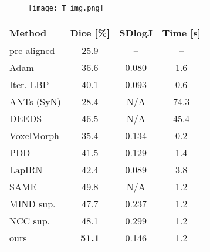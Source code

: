 \begin{figure}
  \centering
  \texttt{[image: T\_img.png]}
\end{figure}

\begin{table}
  \vspace{0.5em}\centering\wuhao
  \begin{tabular}{lccc}
    \toprule
    \textbf{Method} & \textbf{Dice [\%]} & \textbf{SDlogJ} & \textbf{Time [s]} \\
    \midrule
    pre-aligned     & 25.9               & --              & --                \\
    Adam            & 36.6               & 0.080           & 1.6               \\
    Iter. LBP       & 40.1               & 0.093           & 0.6               \\
    ANTs (SyN)      & 28.4               & {N/A}           & 74.3              \\
    DEEDS           & 46.5               & {N/A}           & 45.4              \\
    \midrule
    VoxelMorph      & 35.4               & 0.134           & 0.2               \\
    PDD             & 41.5               & 0.129           & 1.4               \\
    LapIRN          & 42.4               & 0.089           & 3.8               \\
    SAME            & 49.8               & {N/A}           & 1.2               \\
    \midrule
    MIND sup.       & 47.7               & 0.237           & 1.2               \\
    NCC sup.        & 48.1               & 0.299           & 1.2               \\
    \midrule
    ours            & \textbf{51.1}      & 0.146           & 1.2               \\
    \bottomrule
  \end{tabular}
\end{table}

